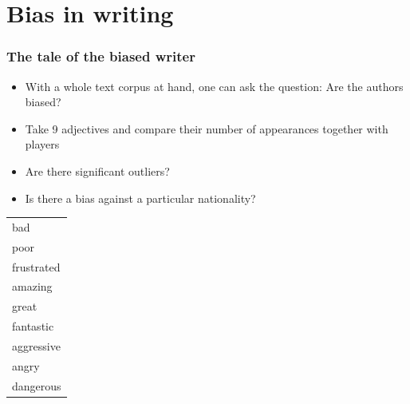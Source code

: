 \documentclass{beamer}
\begin{document}
\section{Bias in writing}

\begin{frame}
\frametitle{The tale of the biased writer}
\begin{minipage}{0.75\textwidth}
\begin{itemize}
\item{With a whole text corpus at hand, one can ask the question: Are the authors biased?}
\item Take 9 adjectives and compare their number of appearances together with players
\item Are there significant outliers?
\item Is there a bias against a particular nationality?
\end{itemize}
\end{minipage}
\begin{minipage}{0.2 \textwidth}\small
\begin{tabular}{|l}
bad\\
poor\\
frustrated\\
amazing\\
great\\
fantastic\\
aggressive\\
angry\\
dangerous
\end{tabular}
\end{minipage}
\end{frame}
\end{document}
